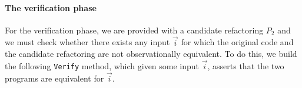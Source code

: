 \documentclass[10pt,conference]{IEEEtran}
\begin{document}





\paragraph{The verification phase} For the verification phase, we are provided with a candidate
refactoring $P_2$ and we must check whether there exists any input
$\vec{i}$ for which the original code and the candidate
refactoring are not observationally equivalent.  To do this, we build
the following \texttt{Verify} method, which given some input
$\vec{i}$, asserts that the two programs are equivalent for
$\vec{i}$.
\end{document}
